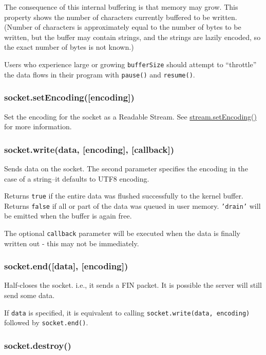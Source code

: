 The consequence of this internal buffering is that memory may grow. This
property shows the number of characters currently buffered to be
written. (Number of characters is approximately equal to the number of
bytes to be written, but the buffer may contain strings, and the strings
are lazily encoded, so the exact number of bytes is not known.)

Users who experience large or growing \texttt{bufferSize} should attempt
to ``throttle'' the data flows in their program with \texttt{pause()}
and \texttt{resume()}.

\subsubsection{socket.setEncoding({[}encoding{]})}

Set the encoding for the socket as a Readable Stream. See
\href{stream.html\#stream\_stream\_setencoding\_encoding}{stream.setEncoding()}
for more information.

\subsubsection{socket.write(data, {[}encoding{]}, {[}callback{]})}

Sends data on the socket. The second parameter specifies the encoding in
the case of a string--it defaults to UTF8 encoding.

Returns \texttt{true} if the entire data was flushed successfully to the
kernel buffer. Returns \texttt{false} if all or part of the data was
queued in user memory. \texttt{'drain'} will be emitted when the buffer
is again free.

The optional \texttt{callback} parameter will be executed when the data
is finally written out - this may not be immediately.

\subsubsection{socket.end({[}data{]}, {[}encoding{]})}

Half-closes the socket. i.e., it sends a FIN packet. It is possible the
server will still send some data.

If \texttt{data} is specified, it is equivalent to calling
\texttt{socket.write(data, encoding)} followed by \texttt{socket.end()}.

\subsubsection{socket.destroy()}

